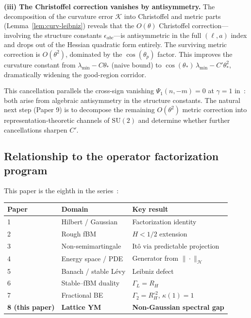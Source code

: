 \documentclass[11pt,a4paper]{article}
\theoremstyle{plain}
\theoremstyle{definition}
\theoremstyle{remark}
\newcommand{\SU}{\mathrm{SU}}
\newcommand{\cH}{\mathcal{H}}
\newcommand{\cK}{\mathcal{K}}
\begin{document}
\medskip\noindent
\textbf{(iii) The Christoffel correction vanishes by antisymmetry.}
The decomposition of the curvature error $\cK$ into Christoffel and
metric parts (Lemma~\ref{lem:curv-leibniz}) reveals that the
$O(\theta)$ Christoffel correction---involving the structure constants
$\epsilon_{abc}$---is antisymmetric in the full $(\ell,a)$ index and
drops out of the Hessian quadratic form entirely. The surviving metric
correction is $O(\theta^2)$, dominated by the $\cos(\theta_p)$
factor. This improves the curvature constant from
$\lambda_{\min} - C\theta_*$ (naive bound) to
$\cos(\theta_*)\,\lambda_{\min} - C'\theta_*^2$, dramatically widening
the good-region corridor.

This cancellation parallels the cross-sign vanishing
$\Psi_1(n,-m) = 0$ at $\gamma = 1$ in~\cite{Fontes2026f}: both arise
from algebraic antisymmetry in the structure constants. The natural
next step (Paper 9) is to decompose the remaining $O(\theta^2)$ metric
correction into representation-theoretic channels of $\SU(2)$ and
determine whether further cancellations sharpen $C'$.

\subsection{Relationship to the operator factorization program}

This paper is the eighth in the series~\cite{Fontes2026a,Fontes2026b,Fontes2026c,Fontes2026i,Fontes2026d,Fontes2026e,Fontes2026f}:

\begin{center}
\begin{tabular}{lll}
\toprule
Paper & Domain & Key result \\
\midrule
1~\cite{Fontes2026a} & Hilbert / Gaussian & Factorization identity \\
2~\cite{Fontes2026b} & Rough fBM & $H < 1/2$ extension \\
3~\cite{Fontes2026c} & Non-semimartingale & It\^o via predictable projection \\
4~\cite{Fontes2026i} & Energy space / PDE & Generator from $\|\cdot\|_{\cH}$ \\
5~\cite{Fontes2026d} & Banach / stable L\'evy & Leibniz defect \\
6~\cite{Fontes2026e} & Stable--fBM duality & $\Gamma_L = R_H$ \\
7~\cite{Fontes2026f} & Fractional BE & $\Gamma_2 = R_H^{\circ 2}$, $\kappa(1)=1$ \\
\textbf{8 (this paper)} & \textbf{Lattice YM} & \textbf{Non-Gaussian spectral gap} \\
\bottomrule
\end{tabular}
\end{center}
\end{document}
